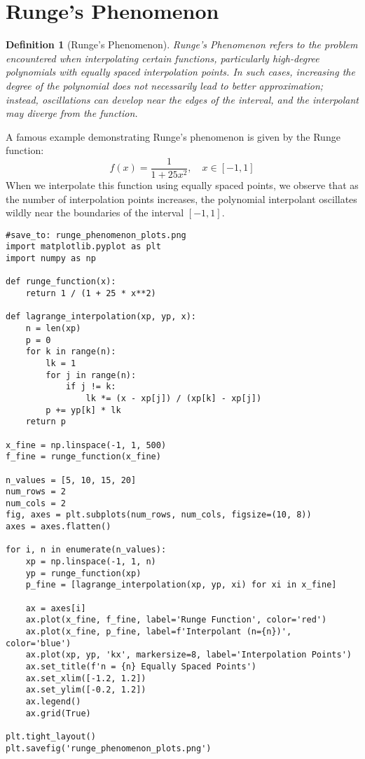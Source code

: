 \documentclass{article}
\newtheorem{definition}{Definition}
\begin{document}
\section{Runge's Phenomenon}

\begin{definition}[Runge's Phenomenon]
Runge's Phenomenon refers to the problem encountered when interpolating certain functions, particularly high-degree polynomials with equally spaced interpolation points. In such cases, increasing the degree of the polynomial does not necessarily lead to better approximation; instead, oscillations can develop near the edges of the interval, and the interpolant may diverge from the function.
\end{definition}

A famous example demonstrating Runge's phenomenon is given by the Runge function:
\[
f(x) = \frac{1}{1 + 25x^2}, \quad x \in [-1, 1]
\]
When we interpolate this function using equally spaced points, we observe that as the number of interpolation points increases, the polynomial interpolant oscillates wildly near the boundaries of the interval $[-1, 1]$.

\begin{verbatim}
#save_to: runge_phenomenon_plots.png
import matplotlib.pyplot as plt
import numpy as np

def runge_function(x):
    return 1 / (1 + 25 * x**2)

def lagrange_interpolation(xp, yp, x):
    n = len(xp)
    p = 0
    for k in range(n):
        lk = 1
        for j in range(n):
            if j != k:
                lk *= (x - xp[j]) / (xp[k] - xp[j])
        p += yp[k] * lk
    return p

x_fine = np.linspace(-1, 1, 500)
f_fine = runge_function(x_fine)

n_values = [5, 10, 15, 20]
num_rows = 2
num_cols = 2
fig, axes = plt.subplots(num_rows, num_cols, figsize=(10, 8))
axes = axes.flatten()

for i, n in enumerate(n_values):
    xp = np.linspace(-1, 1, n)
    yp = runge_function(xp)
    p_fine = [lagrange_interpolation(xp, yp, xi) for xi in x_fine]

    ax = axes[i]
    ax.plot(x_fine, f_fine, label='Runge Function', color='red')
    ax.plot(x_fine, p_fine, label=f'Interpolant (n={n})', color='blue')
    ax.plot(xp, yp, 'kx', markersize=8, label='Interpolation Points')
    ax.set_title(f'n = {n} Equally Spaced Points')
    ax.set_xlim([-1.2, 1.2])
    ax.set_ylim([-0.2, 1.2])
    ax.legend()
    ax.grid(True)

plt.tight_layout()
plt.savefig('runge_phenomenon_plots.png')
\end{verbatim}
\end{document}

